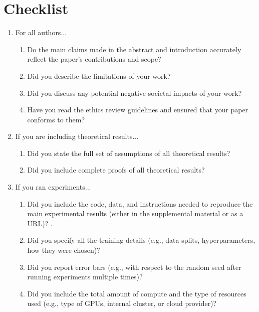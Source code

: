 \section*{Checklist}


\begin{enumerate}

\item For all authors...
\begin{enumerate}
  \item Do the main claims made in the abstract and introduction accurately reflect the paper's contributions and scope?
  \item Did you describe the limitations of your work?
  \item Did you discuss any potential negative societal impacts of your work?
  \item Have you read the ethics review guidelines and ensured that your paper conforms to them?
    \answerYes{}
\end{enumerate}


\item If you are including theoretical results...
\begin{enumerate}
  \item Did you state the full set of assumptions of all theoretical results?
  \item Did you include complete proofs of all theoretical results?
\end{enumerate}


\item If you ran experiments...
\begin{enumerate}
  \item Did you include the code, data, and instructions needed to reproduce the main experimental results (either in the supplemental material or as a URL)?
    .
  \item Did you specify all the training details (e.g., data splits, hyperparameters, how they were chosen)?
        \item Did you report error bars (e.g., with respect to the random seed after running experiments multiple times)?
        \item Did you include the total amount of compute and the type of resources used (e.g., type of GPUs, internal cluster, or cloud provider)?
\end{enumerate}



\end{enumerate}
